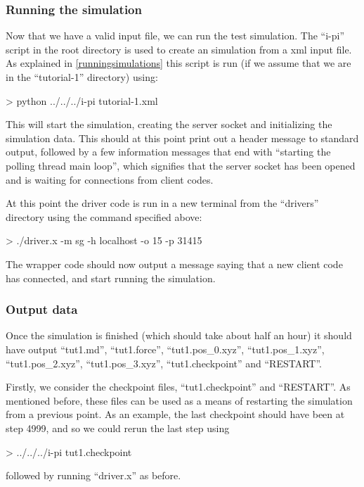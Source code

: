 \documentclass[11pt,english,fleqn]{report}
\newenvironment{code}{%
\footnotesize 
\verbatim
}{
\endverbatim
\normalsize
}
\begin{document}
\subsubsection{Running the simulation}

\label{run1}

Now that we have a valid input file, we can run the test simulation.
The {}``i-pi'' script in the root directory is used to create an
\ipi simulation from a xml input file. As explained in
\ref{runningsimulations} this script is run 
(if we assume that we are in the {}``tutorial-1'' directory) using:

\begin{code}
> python ../../../i-pi tutorial-1.xml
\end{code}

This will start the \ipi simulation, creating the server socket and
initializing the simulation data. This should at this point print
out a header message to standard output, followed by a few information
messages that end with {}``starting the polling thread main loop'',
which signifies that the server socket has been opened and is waiting
for connections from client codes.

At this point the driver code is run in a new terminal 
from the {}``drivers'' directory using the command
specified above:

\begin{code}
> ./driver.x -m sg -h localhost -o 15 -p 31415
\end{code}

The wrapper code should now output a message saying that a new client
code has connected, and start running the simulation.

\subsubsection{Output data}

Once the simulation is finished (which should take about half an hour)
it should have output {}``tut1.md'', {}``tut1.force'', {}``tut1.pos\_0.xyz'',
{}``tut1.pos\_1.xyz'', {}``tut1.pos\_2.xyz'', {}``tut1.pos\_3.xyz'',
{}``tut1.checkpoint'' and {}``RESTART''.

Firstly, we consider the checkpoint files, 
{}``tut1.checkpoint'' and {}``RESTART''.
As mentioned before, these files can be used as a means of restarting
the simulation from a previous point. As an example, the last
checkpoint should have been at step 4999, and so we could rerun
the last step using
\begin{code}
> ../../../i-pi tut1.checkpoint
\end{code}
followed by running {}``driver.x'' as before.
\end{document}

